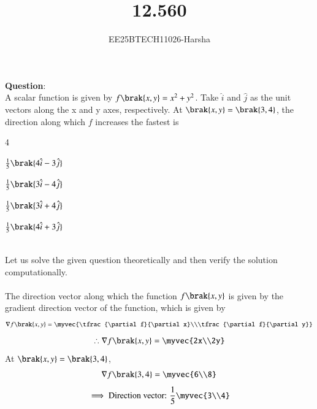 \documentclass[journal]{IEEEtran}
\begin{document}

\vspace{3cm}

\title{12.560}
\author{EE25BTECH11026-Harsha}
 \maketitle
{\let\newpage\relax\maketitle}

\renewcommand{\thefigure}{\theenumi}
\renewcommand{\thetable}{\theenumi}
\setlength{\intextsep}{10pt} %


\renewcommand{\thetable}{\theenumi}

\textbf{Question}:\\
A scalar function is given by $f\brak{x,y}=x^2+y^2$. Take $\hat{i}$ and $\hat{j}$ as the unit vectors along the x and y axes, respectively. At $\brak{x,y}=\brak{3,4}$, the direction along which $f$ increases the fastest is
\begin{enumerate}
\begin{multicols}{4}
    \item $\frac{1}{5}\brak{4\hat{i}-3\hat{j}}$
    \item $\frac{1}{5}\brak{3\hat{i}-4\hat{j}}$
    \item $\frac{1}{5}\brak{3\hat{i}+4\hat{j}}$
    \item $\frac{1}{5}\brak{4\hat{i}+3\hat{j}}$
\end{multicols}
\end{enumerate}
\solution \\
Let us solve the given question theoretically and then verify the solution computationally.\\
\\
The direction vector along which the function $f\brak{x,y}$ is given by the gradient direction vector of the function, which is given by
\begin{align}
    \nabla f\brak{x,y}=\myvec{\tfrac{\partial f}{\partial x}\\\tfrac{\partial f}{\partial y}}
\end{align}
\begin{align}
    \therefore \nabla f\brak{x,y}=\myvec{2x\\2y}
\end{align}
At $\brak{x,y}=\brak{3,4}$,
\begin{align}
    \nabla f\brak{3,4}=\myvec{6\\8}
\end{align}
\begin{align}
    \implies \text{Direction vector: }\frac{1}{5}\myvec{3\\4}
\end{align}
\end{document}
